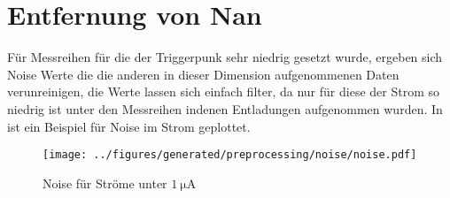 \section{Entfernung von Nan}
\label{sec:nan_removal}
Für Messreihen für die der Triggerpunk sehr niedrig gesetzt wurde, ergeben sich Noise Werte die die anderen in dieser Dimension aufgenommenen Daten verunreinigen, die Werte lassen sich einfach filter, da nur für diese der Strom so niedrig ist unter den Messreihen indenen Entladungen aufgenommen wurden. In  ist ein Beispiel für Noise im Strom geplottet.

\begin{figure}[htbp]
    \centering
    \texttt{[image: ../figures/generated/preprocessing/noise/noise.pdf]}
    \caption{Noise für Ströme unter \(\SI{1}{\micro\ampere}\)}
    \label{fig:noise}
\end{figure}


